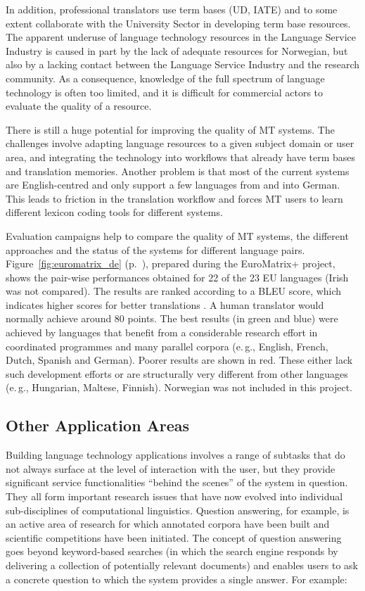 \begin{multicols}{2}
In addition, professional translators use term bases (UD, IATE) and to some extent collaborate with the University Sector in developing term base resources. 
The apparent underuse of language technology resources in the Language Service Industry is caused in part by the lack of adequate resources for Norwegian, but also by a lacking contact between the Language Service Industry and the research community. 
As a consequence, knowledge of the full spectrum of language technology is often too limited, and it is difficult for commercial actors to evaluate the quality of a resource. 

There is still a huge potential for improving the quality of MT systems. The challenges involve adapting language resources to a given subject domain or user area, and integrating the technology into workflows that already have term bases and translation memories. Another problem is that most of the current systems are English-centred and only support a few languages from and into German. This leads to friction in the translation workflow and forces MT users to learn different lexicon coding tools for different systems.

Evaluation campaigns help to compare the quality of MT systems, the different approaches and the status of the systems for different language pairs.
Figure~\ref{fig:euromatrix_de} (p.~\pageref{fig:euromatrix_de}), prepared during the EuroMatrix+ project, shows the pair-wise performances obtained for 22 of the 23 EU languages (Irish was not compared). The results are ranked according to a BLEU score, which indicates higher scores for better translations \cite{bleu1}. A human translator would normally achieve around 80 points. The best results (in green and blue) were achieved by languages that benefit from a considerable research effort in coordinated programmes and many parallel corpora (e.\,g., English, French, Dutch, Spanish and German). Poorer results are shown in red. These either lack such development efforts or are structurally very different from other languages (e.\,g., Hungarian, Maltese, Finnish). Norwegian was not included in this project.

\subsection{Other Application Areas}

Building language technology applications involves a range of subtasks that do not always surface at the level of interaction with the user, but they provide significant service functionalities “behind the scenes” of the system in question. They all form important research issues that have now evolved into individual sub-disciplines of computational linguistics.  Question answering, for example, is an active area of research for which annotated corpora have been built and scientific competitions have been initiated. The concept of question answering goes beyond keyword-based searches (in which the search engine responds by delivering a collection of potentially relevant documents) and enables users to ask a concrete question to which the system provides a single answer. For example:


\end{multicols}
